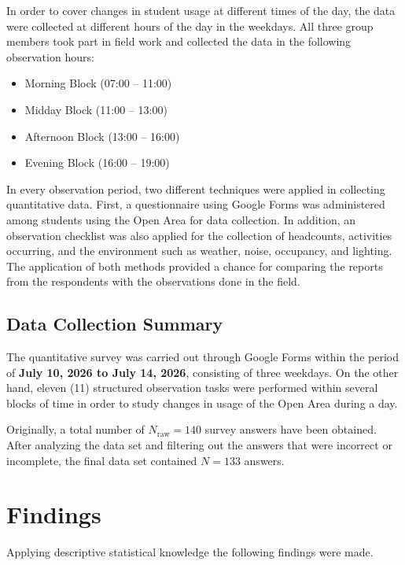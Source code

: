 \documentclass[12pt, a4paper]{report}
\begin{document}
In order to cover changes in student usage at different times of the day, the data were collected at different hours of the day in the weekdays. All three group members took part in field work and collected the data in the following observation hours:

\begin{itemize}
    \item Morning Block (07:00 -- 11:00)
    \item Midday Block (11:00 -- 13:00)
    \item Afternoon Block (13:00 -- 16:00)
    \item Evening Block (16:00 -- 19:00)
\end{itemize}

In every observation period, two different techniques were applied in collecting quantitative data. First, a questionnaire using Google Forms was administered among students using the Open Area for data collection. In addition, an observation checklist was also applied for the collection of headcounts, activities occurring, and the environment such as weather, noise, occupancy, and lighting. The application of both methods provided a chance for comparing the reports from the respondents with the observations done in the field.
\vspace{5cm}
\section{Data Collection Summary}

The quantitative survey was carried out through Google Forms within the period of \textbf{July 10, 2026 to July 14, 2026}, consisting of three weekdays. On the other hand, eleven (11) structured observation tasks were performed within several blocks of time in order to study changes in usage of the Open Area during a day.

Originally, a total number of $N_{\text{raw}} = 140$ survey answers have been obtained. After analyzing the data set and filtering out the answers that were incorrect or incomplete, the final data set contained $N = 133$ answers.

\chapter{Findings}
Applying descriptive statistical knowledge the following findings were made.
\end{document}
